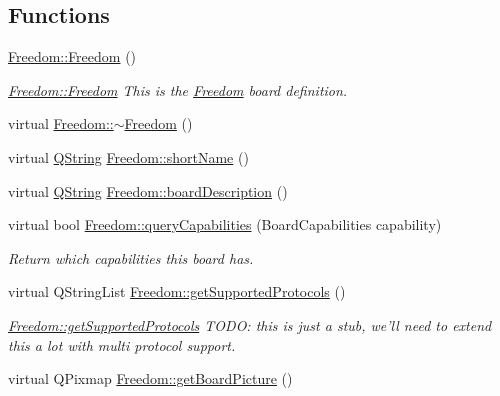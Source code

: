 \subsection*{Functions}
\begin{DoxyCompactItemize}
\item 
\hyperlink{group___boards___tau_labs_plugin_ga87f0c726ad13819e3918a3e270021fe9}{Freedom\-::\-Freedom} ()
\begin{DoxyCompactList}\small\item\em \hyperlink{group___boards___tau_labs_plugin_ga87f0c726ad13819e3918a3e270021fe9}{Freedom\-::\-Freedom} This is the \hyperlink{class_freedom}{Freedom} board definition. \end{DoxyCompactList}\item 
virtual \hyperlink{group___boards___tau_labs_plugin_ga877df717ce1cf3c223d88f54ba538092}{Freedom\-::$\sim$\-Freedom} ()
\item 
virtual \hyperlink{group___u_a_v_objects_plugin_gab9d252f49c333c94a72f97ce3105a32d}{Q\-String} \hyperlink{group___boards___tau_labs_plugin_ga430b08f4808aa122ae6f93fc1afd1ef5}{Freedom\-::short\-Name} ()
\item 
virtual \hyperlink{group___u_a_v_objects_plugin_gab9d252f49c333c94a72f97ce3105a32d}{Q\-String} \hyperlink{group___boards___tau_labs_plugin_ga7668e232716f9de134cbcbb2936fda15}{Freedom\-::board\-Description} ()
\item 
virtual bool \hyperlink{group___boards___tau_labs_plugin_ga9fe63b3e3b843bb34144942f4faafa3f}{Freedom\-::query\-Capabilities} (Board\-Capabilities capability)
\begin{DoxyCompactList}\small\item\em Return which capabilities this board has. \end{DoxyCompactList}\item 
virtual Q\-String\-List \hyperlink{group___boards___tau_labs_plugin_ga0666d1e73c1b7042303e2804c849420d}{Freedom\-::get\-Supported\-Protocols} ()
\begin{DoxyCompactList}\small\item\em \hyperlink{group___boards___tau_labs_plugin_ga0666d1e73c1b7042303e2804c849420d}{Freedom\-::get\-Supported\-Protocols} T\-O\-D\-O\-: this is just a stub, we'll need to extend this a lot with multi protocol support. \end{DoxyCompactList}\item 
virtual Q\-Pixmap \hyperlink{group___boards___tau_labs_plugin_ga07d3982d49c35a87baa85e32af63e49c}{Freedom\-::get\-Board\-Picture} ()

\end{DoxyCompactItemize}
